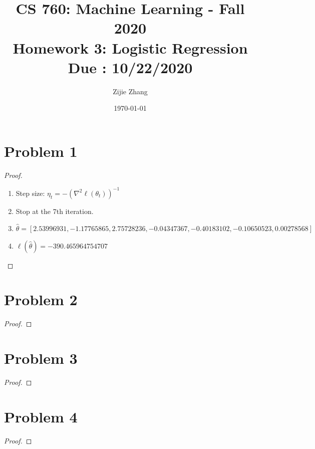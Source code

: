 \documentclass{article}
\title{CS 760: Machine Learning - Fall 2020\\
        {\Large \textbf{Homework 3: Logistic Regression}}\\
        {\normalsize \textbf{Due : 10/22/2020}}
    }
\author{Zijie Zhang}
\date{\today}
\begin{document}
    \maketitle
    
\section*{Problem 1}
    \begin{proof}
    \indent
    \begin{enumerate}[label=(\alph*)]
        \item Step size:
                $\eta_t = -\left(\nabla^2 \ell(\theta_t)\right)^{-1}$
        \item Stop at the 7th iteration.
        \item $\hat{\theta}=[  2.53996931,
                                -1.17765865,
                                2.75728236,
                                -0.04347367,
                                -0.40183102,
                                -0.10650523,
                                0.00278568
                            ]$
        \item $\ell(\hat{\theta})=-390.465964754707$
    \end{enumerate}
    \end{proof}

\section*{Problem 2}
    \begin{proof}
    
    \end{proof}

\section*{Problem 3}
    \begin{proof}
        
    \end{proof}

\section*{Problem 4}
    \begin{proof}
        
    \end{proof}
\end{document}
